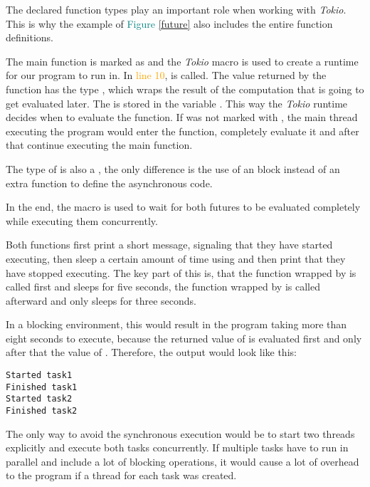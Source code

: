 The declared function types play an important role when working with \textit{Tokio}. This is why the example of
\textcolor{teal}{Figure \ref{future}} also includes the entire function definitions.

The main function is marked as  and the \textit{Tokio} macro is used to create a runtime for our program to
run in. In \textcolor{orange}{line 10},  is called. The value returned by the function has the
type , which wraps the result of the computation that is going to get evaluated later. The
 is stored in the variable . This way the \textit{Tokio} runtime decides when to evaluate
the function. If  was not marked with , the main thread executing the program would
enter the function, completely evaluate it and after that continue executing the main function.

The type of  is also a , the only difference is the use of an  block instead of
an extra function to define the asynchronous code.

In the end, the macro  is used to wait for both futures to be evaluated completely while executing
them concurrently.

Both functions first print a short message, signaling that they have started executing, then sleep a certain amount of
time using  and then print that they have stopped executing. The key part of this is, that the
function wrapped by  is called first and sleeps for five seconds, the function wrapped by 
is called afterward and only sleeps for three seconds.

In a blocking environment, this would result in the program taking more than eight seconds to execute, because the
returned value of  is evaluated first and only after that the value of . Therefore, the
output would look like this:

\begin{verbatim}
Started task1
Finished task1
Started task2
Finished task2
\end{verbatim}

The only way to avoid the synchronous execution would be to start two threads explicitly and execute both tasks
concurrently. If multiple tasks have to run in parallel and include a lot of blocking operations, it would cause a lot
of overhead to the program if a thread for each task was created.


